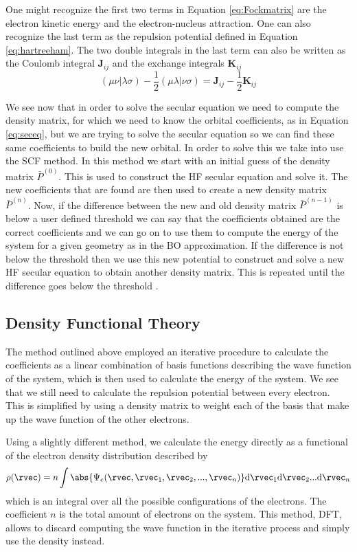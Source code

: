 \documentclass[../master_thesis.tex]{subfiles}
\begin{document}
One might recognize the first two terms in  Equation \ref{eq:Fockmatrix} are
the electron kinetic energy and the electron-nucleus attraction. One can also recognize the
last term as the repulsion potential defined in Equation \ref{eq:hartreeham}.
The two double integrals in the last term can also be written as the Coulomb integral $\mathbf{J}_{ij}$
and the exchange integrals $\mathbf{K}_{ij}$ \cite{Cramer:2004}
\begin{equation}
  (\mu\nu|\lambda\sigma) - \frac{1}{2}(\mu\lambda|\nu\sigma) = \mathbf{J}_{ij} - \frac{1}{2}\mathbf{K}_{ij}
\end{equation}

We see now that in order to solve the secular equation we need to compute the
density matrix, for which we need to know the orbital coefficients, as in Equation
\ref{eq:seceq}, but we  are trying to solve the secular equation so we can find
these same coefficients to build the new orbital.
In order to solve this we take into use the \ac{SCF} method. In this method
we start with an initial guess of the density matrix $\bar{P}^{(0)}$. This
is used to construct the \ac{HF} secular equation and solve it. The new coefficients
that are found are then used to create a new density matrix $\bar{P}^{(n)}$. Now, if
the difference between the new and old density matrix $ \bar{P}^{(n-1)}$ is below
a user defined threshold we can say that the coefficients obtained are the correct
coefficients and we can go on to use them to compute the energy of the system for
a given geometry as in the \ac{BO} approximation. If the difference
is not below the threshold then we use this new potential to construct and solve
a new \ac{HF} secular equation to obtain another density matrix. This is repeated
until the difference goes below the threshold \cite{Helgaker:2012, Cramer:2004}.


\subsection{Density Functional Theory}
The method outlined above employed an iterative procedure to calculate the coefficients
as a linear combination of basis functions describing the wave function of the
system, which is then used to calculate the energy of the system. We see that we
still need to calculate the repulsion potential between every electron. This is
simplified by using a density matrix to weight each of the basis that make up the
wave function of the other electrons.

Using a slightly different method, we calculate the energy directly as a functional
of the electron density distribution \cite{Sorland, Cramer:2004} described by
\begin{equation}\label{eq:densityintegral}
  \rho(\rvec) = n \int\abs{\Psi_e(\rvec, \rvec_1, \rvec_2,..., \rvec_n)} \text{d}\rvec_1\text{d}\rvec_2...\text{d}\rvec_n
\end{equation}
which is an integral over all the possible configurations of the electrons. The
coefficient $n$ is the total amount of electrons on the system. This method,
\ac{DFT}, allows to discard computing the wave function in the iterative process and
simply use the density instead.
\end{document}
